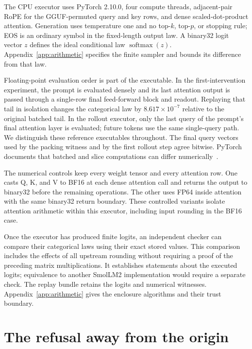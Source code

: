 \documentclass[10pt]{article}
\theoremstyle{definition}\newtheorem{definition}[theorem]{Definition}
\begin{document}
The CPU executor uses PyTorch 2.10.0, four compute threads, adjacent-pair RoPE for the GGUF-permuted query and key rows, and dense scaled-dot-product attention. Generation uses temperature one and no top-$k$, top-$p$, or stopping rule; EOS is an ordinary symbol in the fixed-length output law. A binary32 logit vector $z$ defines the ideal conditional law $\operatorname{softmax}(z)$. Appendix~\ref{app:arithmetic} specifies the finite sampler and bounds its difference from that law.

Floating-point evaluation order is part of the executable. In the first-intervention experiment, the prompt is evaluated densely and its last attention output is passed through a single-row final feed-forward block and readout. Replaying that tail in isolation changes the categorical law by $8.617\times10^{-7}$ relative to the original batched tail. In the rollout executor, only the last query of the prompt's final attention layer is evaluated; future tokens use the same single-query path. We distinguish these reference executables throughout. The final query vectors used by the packing witness and by the first rollout step agree bitwise. PyTorch documents that batched and slice computations can differ numerically~\citep{pytorchnumerics}.

The numerical controls keep every weight tensor and every attention row. One casts Q, K, and V to BF16 at each dense attention call and returns the output to binary32 before the remaining operations. The other uses FP64 inside attention with the same binary32 return boundary. These controlled variants isolate attention arithmetic within this executor, including input rounding in the BF16 case.

Once the executor has produced finite logits, an independent checker can compare their categorical laws using their exact stored values. This comparison includes the effects of all upstream rounding without requiring a proof of the preceding matrix multiplications. It establishes statements about the executed logits; equivalence to another SmolLM2 implementation would require a separate check. The replay bundle retains the logits and numerical witnesses. Appendix~\ref{app:arithmetic} gives the enclosure algorithms and their trust boundary.

\section{The refusal away from the origin}
\end{document}
